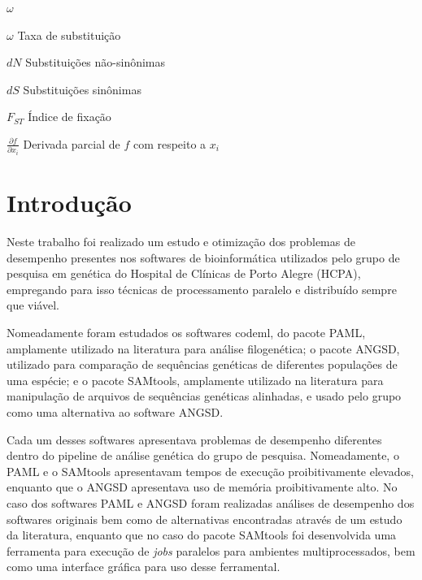 \documentclass[cic,tc]{iiufrgs}
\begin{document}
\begin{listofsymbols}{$\omega$}
    \item[$\omega$] Taxa de substituição
    \item[$dN$] Substituições não-sinônimas
    \item[$dS$] Substituições sinônimas
    \item[$F_{ST}$] Índice de fixação
    \item[$\frac{\partial f}{\partial x_i}$] Derivada parcial de $f$ com respeito a $x_i$
\end{listofsymbols}

\tableofcontents


\chapter{Introdução}

Neste trabalho foi realizado um estudo e otimização dos problemas de desempenho
presentes nos softwares de bioinformática utilizados pelo grupo de pesquisa em
genética do Hospital de Clínicas de Porto Alegre (HCPA), empregando para isso
técnicas de processamento paralelo e distribuído sempre que viável.

Nomeadamente foram estudados os softwares codeml, do pacote
PAML,\cite{yang2007paml} amplamente utilizado na literatura para análise
filogenética;\cite{maldonado2016lmap} o pacote ANGSD, utilizado para comparação
de sequências genéticas de diferentes populações de uma
espécie;\cite{korneliussen2014angsd} e o pacote SAMtools, amplamente utilizado
na literatura para manipulação de arquivos de sequências genéticas
alinhadas,\cite{danecek2021twelve} e usado pelo grupo como uma alternativa ao
software ANGSD.

Cada um desses softwares apresentava problemas de desempenho diferentes dentro
do pipeline de análise genética do grupo de pesquisa. Nomeadamente, o PAML e o
SAMtools apresentavam tempos de execução proibitivamente elevados, enquanto que
o ANGSD apresentava uso de memória proibitivamente alto. No caso dos softwares
PAML e ANGSD foram realizadas análises de desempenho dos softwares originais
bem como de alternativas encontradas através de um estudo da literatura,
enquanto que no caso do pacote SAMtools foi desenvolvida uma ferramenta para
execução de \textit{jobs} paralelos para ambientes multiprocessados, bem como
uma interface gráfica para uso desse ferramental.
\end{document}

